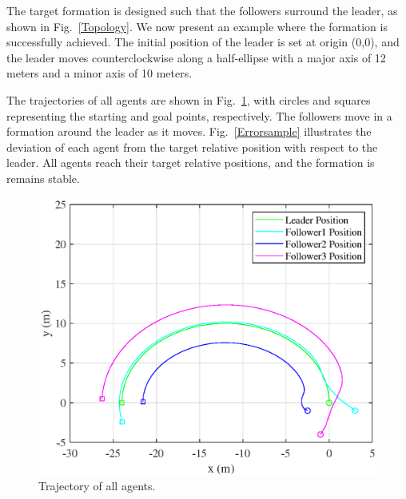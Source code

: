 \documentclass[a4paper,fleqn,10pt,twocolumn]{SICE_ISCS}
\newcommand{\Figref}[1]{{Fig.~\ref{#1}}}
\begin{document}
The target formation is designed such that the followers surround the leader, as shown in \Figref{Topology}. We now present an example where the formation is successfully achieved. The initial position of the leader is set at origin (0,0), and the leader moves counterclockwise along a half-ellipse with a major axis of 12 meters and a minor axis of 10 meters.

The trajectories of all agents are shown in \Figref{Trajectorysample}, with circles and squares representing the starting and goal points, respectively. The followers  move in a formation around the leader as it moves. \Figref{Errorsample} illustrates the deviation of each agent from the target relative position with respect to the leader. All agents reach their target relative positions, and the formation is remains stable.



\begin{figure}[t]
	\begin{center}
		\includegraphics[clip,width=\linewidth]{Fig/sampletrajectry.eps}
		\caption{Trajectory of all agents.}
		\label{Trajectorysample}
	\end{center}
	\vspace{-2mm}
\end{figure}
\end{document}
